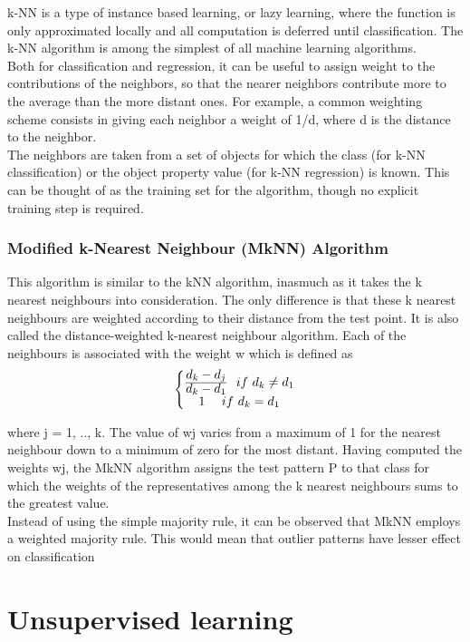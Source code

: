 k-NN is a type of instance based learning, or lazy learning, where the function is only approximated locally and all computation is deferred until classification. The k-NN algorithm is among the simplest of all machine learning algorithms.\\ Both for classification and regression, it can be useful to assign weight to the contributions of the neighbors, so that the nearer neighbors contribute more to the average than the more distant ones. For example, a common weighting scheme consists in giving each neighbor a weight of 1/d, where d is the distance to the neighbor.\\ The neighbors are taken from a set of objects for which the class (for k-NN classification) or the object property value (for k-NN regression) is known. This can be thought of as the training set for the algorithm, though no explicit training step is required.

\subsubsection{Modified k-Nearest Neighbour (MkNN) Algorithm}
This algorithm is similar to the kNN algorithm, inasmuch as it takes the k nearest
neighbours into consideration. The only difference is that these k nearest neighbours
are weighted according to their distance from the test point. It is also called
the distance-weighted k-nearest neighbour algorithm. Each of the neighbours is
associated with the weight w which is defined as
$$ \left\{\begin{matrix}
\frac{ \mathlarger{d_{k} - d_{j}}} { \mathlarger{{d_{k} - d_{1}} }} \   \ if \ d_{k} \neq d_{1} \\ 
\mathlarger{1} \  \   \     \ if \ d_{k}  =  d_{1}
\end{matrix}\right.   $$

where j = 1, .., k. The value of wj varies from a maximum of 1 for the nearest
neighbour down to a minimum of zero for the most distant. Having computed the
weights wj, the MkNN algorithm assigns the test pattern P to that class for which the
weights of the representatives among the k nearest neighbours sums to the greatest
value.\\
Instead of using the simple majority rule, it can be observed that MkNN employs
a weighted majority rule. This would mean that outlier patterns have lesser effect on
classification

\section{Unsupervised learning}

